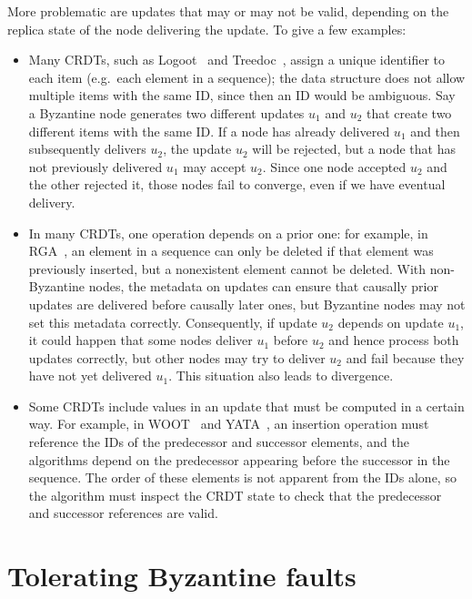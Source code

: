 \documentclass[sigplan,review]{acmart}
\begin{document}
More problematic are updates that may or may not be valid, depending on the replica state of the node delivering the update.
To give a few examples:
\begin{itemize}
\item Many CRDTs, such as Logoot~\cite{Weiss:2009ht} and Treedoc~\cite{Preguica:2009}, assign a unique identifier to each item (e.g.\ each element in a sequence); the data structure does not allow multiple items with the same ID, since then an ID would be ambiguous.
Say a Byzantine node generates two different updates $u_1$ and $u_2$ that create two different items with the same ID.
If a node has already delivered $u_1$ and then subsequently delivers $u_2$, the update $u_2$ will be rejected, but a node that has not previously delivered $u_1$ may accept $u_2$.
Since one node accepted $u_2$ and the other rejected it, those nodes fail to converge, even if we have eventual delivery.

\item In many CRDTs, one operation depends on a prior one: for example, in RGA~\cite{Roh:2011}, an element in a sequence can only be deleted if that element was previously inserted, but a nonexistent element cannot be deleted.
With non-Byzantine nodes, the metadata on updates can ensure that causally prior updates are delivered before causally later ones, but Byzantine nodes may not set this metadata correctly.
Consequently, if update $u_2$ depends on update $u_1$, it could happen that some nodes deliver $u_1$ before $u_2$ and hence process both updates correctly, but other nodes may try to deliver $u_2$ and fail because they have not yet delivered $u_1$.
This situation also leads to divergence.

\item Some CRDTs include values in an update that must be computed in a certain way.
For example, in WOOT~\cite{Oster:2006} and YATA~\cite{Nicolaescu:2016}, an insertion operation must reference the IDs of the predecessor and successor elements, and the algorithms depend on the predecessor appearing before the successor in the sequence.
The order of these elements is not apparent from the IDs alone, so the algorithm must inspect the CRDT state to check that the predecessor and successor references are valid.
\end{itemize}

\section{Tolerating Byzantine faults}\label{sec:solution}
\end{document}
